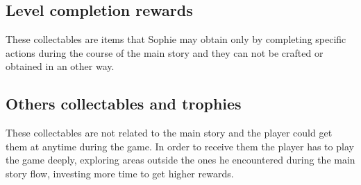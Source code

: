 \subsection{Level completion rewards}
These collectables are items that Sophie may obtain only by completing specific actions during the course of the main story and they can not be crafted or obtained in an other way.


  
  
  


\subsection{Others collectables and trophies}
These collectables are not related to the main story and the player could get them at anytime during the game. In order to receive them the player has to play the game deeply, exploring areas outside the ones he encountered during the main story flow, investing more time to get higher rewards.
  
  
  


